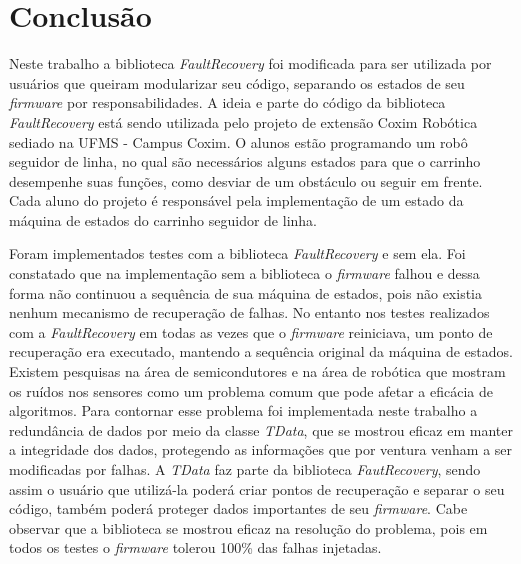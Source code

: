 
\chapter{Conclusão} \label{cap:conclusao}

Neste trabalho a biblioteca \textit{FaultRecovery} foi modificada para ser utilizada por usuários que queiram modularizar seu código, separando os estados de seu \textit{firmware} por responsabilidades. A ideia e parte do código da biblioteca \textit{FaultRecovery} está sendo utilizada pelo projeto de extensão Coxim Robótica sediado na UFMS - Campus Coxim. O alunos estão programando um robô seguidor de linha, no qual são necessários alguns estados para que o carrinho desempenhe suas funções, como desviar de um obstáculo ou seguir em frente. Cada aluno do projeto é responsável pela implementação de um estado da máquina de estados do carrinho seguidor de linha.  

Foram implementados testes com a biblioteca \textit{FaultRecovery} e sem ela. Foi constatado que na implementação sem a biblioteca o \textit{firmware} falhou e dessa forma não continuou a sequência de sua máquina de estados, pois não existia nenhum mecanismo de recuperação de falhas. No entanto nos testes realizados com a \textit{FaultRecovery} em todas as vezes que o \textit{firmware} reiniciava, um ponto de recuperação era executado, mantendo a sequência original da máquina de estados. Existem pesquisas na área de semicondutores e na área de robótica que mostram os ruídos nos sensores como um problema comum que pode afetar a eficácia de algoritmos. Para contornar esse problema foi implementada neste trabalho a redundância de dados por meio da classe \textit{TData}, que se mostrou eficaz em manter a integridade dos dados, protegendo as informações que por ventura venham a ser modificadas por falhas. A \textit{TData} faz parte da biblioteca \textit{FautRecovery}, sendo assim o usuário que utilizá-la poderá criar pontos de recuperação e separar o seu código, também poderá proteger dados importantes de seu \textit{firmware}. Cabe observar que a biblioteca se mostrou eficaz na resolução do problema, pois em todos os testes o \textit{firmware} tolerou 100\% das falhas injetadas.

